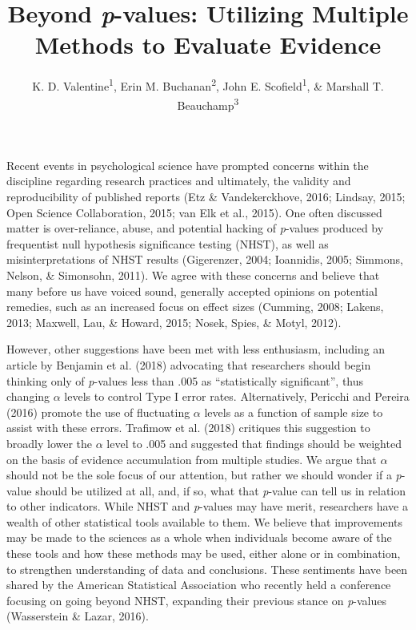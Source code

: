 \documentclass[,man, mask]{apa6}
\title{Beyond \emph{p}-values: Utilizing Multiple Methods to Evaluate Evidence}
\author{K. D. Valentine\textsuperscript{1}, Erin M. Buchanan\textsuperscript{2}, John E. Scofield\textsuperscript{1}, \& Marshall T. Beauchamp\textsuperscript{3}}
\date{}
\affiliation{
\vspace{0.5cm}
\textsuperscript{1} University of Missouri\\\textsuperscript{2} Missouri State University\\\textsuperscript{3} University of Missouri - Kansas City}
\begin{document}
\maketitle

Recent events in psychological science have prompted concerns within the discipline regarding research practices and ultimately, the validity and reproducibility of published reports (Etz \& Vandekerckhove, 2016; Lindsay, 2015; Open Science Collaboration, 2015; van Elk et al., 2015). One often discussed matter is over-reliance, abuse, and potential hacking of \emph{p}-values produced by frequentist null hypothesis significance testing (NHST), as well as misinterpretations of NHST results (Gigerenzer, 2004; Ioannidis, 2005; Simmons, Nelson, \& Simonsohn, 2011). We agree with these concerns and believe that many before us have voiced sound, generally accepted opinions on potential remedies, such as an increased focus on effect sizes (Cumming, 2008; Lakens, 2013; Maxwell, Lau, \& Howard, 2015; Nosek, Spies, \& Motyl, 2012).

However, other suggestions have been met with less enthusiasm, including an article by Benjamin et al. (2018) advocating that researchers should begin thinking only of \emph{p}-values less than .005 as \enquote{statistically significant}, thus changing \(\alpha\) levels to control Type I error rates. Alternatively, Pericchi and Pereira (2016) promote the use of fluctuating \(\alpha\) levels as a function of sample size to assist with these errors. Trafimow et al. (2018) critiques this suggestion to broadly lower the \(\alpha\) level to .005 and suggested that findings should be weighted on the basis of evidence accumulation from multiple studies. We argue that \(\alpha\) should not be the sole focus of our attention, but rather we should wonder if a \emph{p}-value should be utilized at all, and, if so, what that \emph{p}-value can tell us in relation to other indicators. While NHST and \emph{p}-values may have merit, researchers have a wealth of other statistical tools available to them. We believe that improvements may be made to the sciences as a whole when individuals become aware of the these tools and how these methods may be used, either alone or in combination, to strengthen understanding of data and conclusions. These sentiments have been shared by the American Statistical Association who recently held a conference focusing on going beyond NHST, expanding their previous stance on \emph{p}-values (Wasserstein \& Lazar, 2016).
\end{document}
